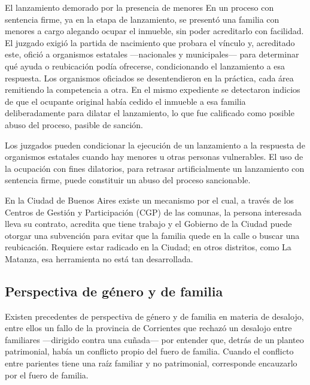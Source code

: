 \documentclass[12pt,oneside]{book}
\begin{document}
\begin{example}{El lanzamiento demorado por la presencia de menores}
En un proceso con sentencia firme, ya en la etapa de lanzamiento, se presentó una familia con menores a cargo alegando ocupar el inmueble, sin poder acreditarlo con facilidad. El juzgado exigió la partida de nacimiento que probara el vínculo y, acreditado este, ofició a organismos estatales ---nacionales y municipales--- para determinar qué ayuda o reubicación podía ofrecerse, condicionando el lanzamiento a esa respuesta. Los organismos oficiados se desentendieron en la práctica, cada área remitiendo la competencia a otra. En el mismo expediente se detectaron indicios de que el ocupante original había cedido el inmueble a esa familia deliberadamente para dilatar el lanzamiento, lo que fue calificado como posible abuso del proceso, pasible de sanción.
\end{example}

\begin{important}
Los juzgados pueden condicionar la ejecución de un lanzamiento a la respuesta de organismos estatales cuando hay menores u otras personas vulnerables. El uso de la ocupación con fines dilatorios, para retrasar artificialmente un lanzamiento con sentencia firme, puede constituir un abuso del proceso sancionable.
\end{important}

En la Ciudad de Buenos Aires existe un mecanismo por el cual, a través de los Centros de Gestión y Participación (CGP) de las comunas, la persona interesada lleva su contrato, acredita que tiene trabajo y el Gobierno de la Ciudad puede otorgar una subvención para evitar que la familia quede en la calle o buscar una reubicación. Requiere estar radicado en la Ciudad; en otros distritos, como La Matanza, esa herramienta no está tan desarrollada.

\subsection{Perspectiva de género y de familia}

Existen precedentes de perspectiva de género y de familia en materia de desalojo, entre ellos un fallo de la provincia de Corrientes que rechazó un desalojo entre familiares ---dirigido contra una cuñada--- por entender que, detrás de un planteo patrimonial, había un conflicto propio del fuero de familia. Cuando el conflicto entre parientes tiene una raíz familiar y no patrimonial, corresponde encauzarlo por el fuero de familia.
\end{document}
